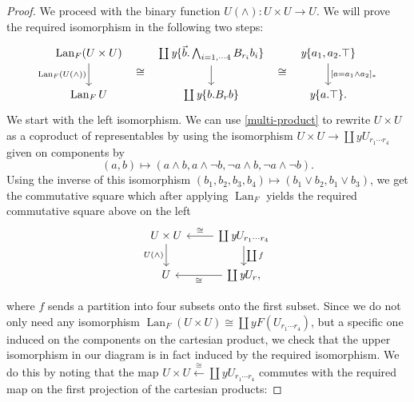 \documentclass[a4paper]{amsproc}
\theoremstyle{plain}
\theoremstyle{definition}
\theoremstyle{remark}
\numberwithin{equation}{section}
\newcommand{\y}{\textit{y}}
\DeclareMathOperator{\Lan}{Lan}
\begin{document}
\begin{proof}
We proceed with the binary function $U(\wedge): U \times U \to U$. We will prove the required isomorphism in the following two steps:
\[
\begin{tikzcd}
\Lan_F(U \times U) \arrow[d, "\Lan_F(U(\wedge))"'] \arrow[r, phantom, shift right=7, "\cong"] & {\coprod \y \{\vec{b}.\bigwedge_{i=1,\cdots 4} B_{r_i} b_i\}} \arrow[d] \arrow[r, phantom, shift right=7, "\cong"] & {\y \{a_1,a_2.\top\}} \arrow[d, "{[a = a_1 \wedge a_2]_*}"] \\
\Lan_F U                                          & \coprod \y \{b.B_rb\} & \y\{a.\top\} .
\end{tikzcd}
\]
We start with the left isomorphism. We can use \ref{multi-product} to rewrite $U \times U$ as a coproduct of representables by using the isomorphism $U \times U \to \coprod \y U_{r_1 \cdots r_4}$ given on components by
\[
(a,b) \mapsto (a \wedge b, a \wedge \neg b, \neg a \wedge b, \neg a \wedge \neg b) .
\]
Using the inverse of this isomorphism $(b_1,b_2,b_3,b_4) \mapsto (b_1 \vee b_2, b_1 \vee b_3)$, we get the commutative square which after applying $\Lan_F$ yields the required commutative square above on the left
\[
\begin{tikzcd}
U \times U \arrow[d, "U(\wedge)"'] & \coprod \y U_{r_1 \cdots r_4} \arrow[d, "\coprod f"] \arrow[l, "\cong"'] \\
U                                  & \coprod \y U_r \arrow[l, "\cong"]                          ,
\end{tikzcd}
\]

where $f$ sends a partition into four subsets onto the first subset. Since we do not only need any isomorphism $\Lan_F (U \times U) \cong \coprod \y F (U_{r_1 \cdots r_4})$, but a specific one induced on the components on the cartesian product, we check that the upper isomorphism in our diagram is in fact induced by the required isomorphism. We do this by noting that the map $U \times U \xleftarrow{\cong} \coprod \y U_{r_1 \cdots r_4}$ commutes with the required map on the first projection of the cartesian products:


\end{proof}
\end{document}
